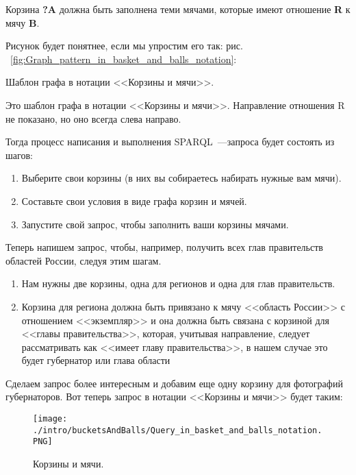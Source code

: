 Корзина \textbf{?A} должна быть заполнена теми мячами, которые имеют отношение \textbf{R} к мячу \textbf{B}.

Рисунок будет понятнее, если мы упростим его так: рис. ~\ref{fig:Graph_pattern_in_basket_and_balls_notation}: 

\begin{marginfigure}[1.0cm]
	{
		\setlength{\fboxsep}{0pt}%
		\setlength{\fboxrule}{1pt}%
	}
    \caption{Шаблон графа в нотации <<Корзины и мячи>>.}
	\label{fig:Graph_pattern_in_basket_and_balls_notation}
\end{marginfigure}

Это шаблон графа в нотации <<Корзины и мячи>>. Направление отношения R не показано, но оно всегда слева направо.

Тогда процесс написания и выполнения SPARQL~---запроса будет состоять из шагов:
\begin{enumerate}
    \item Выберите свои корзины (в них вы собираетесь набирать нужные вам мячи).
    \item Составьте свои условия в виде графа корзин и мячей.
    \item Запустите свой запрос, чтобы заполнить ваши корзины мячами.
\end{enumerate}

Теперь напишем запрос, чтобы, например, получить всех глав правительств областей России, следуя этим шагам.

\begin{enumerate}
    \item Нам нужны две корзины, одна для регионов и одна для глав правительств.
    \item Корзина для региона должна быть привязано к мячу <<область России>> с отношением <<экземпляр>> и она должна быть связана с корзиной для <<главы правительства>>, которая, учитывая направление, следует рассматривать как <<имеет главу правительства>>, в нашем случае это будет губернатор или глава области
\end{enumerate}

Сделаем запрос более интересным и добавим еще одну корзину для фотографий губернаторов. Вот теперь запрос в нотации <<Корзины и мячи>> будет таким:

\begin{figure*}[h!]
    \texttt{[image: ./intro/bucketsAndBalls/Query\_in\_basket\_and\_balls\_notation.PNG]}
    \caption{Корзины и мячи.}
	\label{fig:Query_in_basket_and_balls_notation}
\end{figure*}

